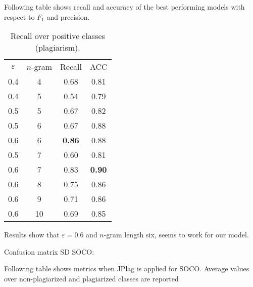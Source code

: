 \newpage

Following table shows recall and accuracy of the best performing models with respect to $F_1$ and precision.

\begin{table}[ht]
\centering
\caption{Recall over positive classes (plagiarism).}
\label{lbl-sd-best-perf}
\begin{tabular}{|c|c|c|c|} \hline
$\varepsilon$  & $n$-gram & Recall & ACC  \\ \hhline{|=|=|=|=|}
0.4 & 4  & 0.68   & 0.81 \\ \hline
0.4 & 5  & 0.54   & 0.79 \\ 
0.5 & 5  & 0.67   & 0.82 \\ \hline
0.5 & 6  & 0.67   & 0.88 \\
0.6 & 6  & \bf 0.86   & 0.88 \\ \hline
0.5 & 7  & 0.60    & 0.81 \\
0.6 & 7  & 0.83   & \bf 0.90  \\ \hline
0.6 & 8  & 0.75   & 0.86 \\ \hline
0.6 & 9  & 0.71   & 0.86 \\ \hline
0.6 & 10 & 0.69   & 0.85 \\ \hline
\end{tabular}
\end{table}

Results show that $\varepsilon = 0.6$ and $n$-gram length six, seems to work for our model. 

Confusion matrix SD SOCO:

\begin{table}[ht]
\centering
\caption{Confusion matrix for best performing model (6-g)}
\label{tbl-sd-soco-conf}
\end{table}



Following table shows metrics when JPlag is applied for SOCO. Average values over non-plagiarized and plagiarized classes are reported

